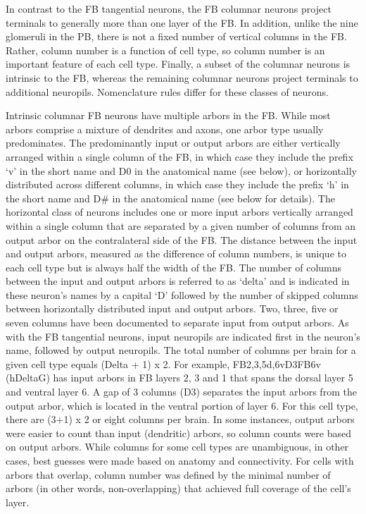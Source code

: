\documentclass{article}
\begin{document}
In contrast to the FB tangential neurons, the FB columnar neurons project terminals to generally more than one layer of the FB. In addition, unlike the nine glomeruli in the PB, there is not a fixed number of vertical columns in the FB. Rather, column number is a function of cell type, so column number is an important feature of each cell type. Finally, a subset of the columnar neurons is intrinsic to the FB, whereas the remaining columnar neurons project terminals to additional neuropils. Nomenclature rules differ for these classes of neurons.

Intrinsic columnar FB neurons have multiple arbors in the FB. While most arbors comprise a mixture of dendrites and axons, one arbor type usually predominates. The predominantly input or output arbors are either vertically arranged within a single column of the FB, in which case they include the prefix ‘v’ in the short name and D0 in the anatomical name (see below), or horizontally distributed across different columns, in which case they include the prefix ‘h’ in the short name and D\# in the anatomical name (see below for details). The horizontal class of neurons includes one or more input arbors vertically arranged within a single column that are separated by a given number of columns from an output arbor on the contralateral side of the FB. The distance between the input and output arbors, measured as the difference of column numbers, is unique to each cell type but is always half the width of the FB. The number of columns between the input and output arbors is referred to as ‘delta’ and is indicated in these neuron’s names by a capital ‘D’ followed by the number of skipped columns between horizontally distributed input and output arbors. Two, three, five or seven columns have been documented to separate input from output arbors. As with the FB tangential neurons, input neuropils are indicated first in the neuron’s name, followed by output neuropils. The total number of columns per brain for a given cell type equals (Delta + 1) x 2. For example, FB2,3,5d,6vD3FB6v (hDeltaG) has input arbors in FB layers 2, 3 and 1 that spans the dorsal layer 5 and ventral layer 6. A gap of 3 columns (D3) separates the input arbors from the output arbor, which is located in the ventral portion of layer 6. For this cell type, there are (3+1) x 2 or eight columns per brain. In some instances, output arbors were easier to count than input (dendritic) arbors, so column counts were based on output arbors. While columns for some cell types are unambiguous, in other cases, best guesses were made based on anatomy and connectivity. For cells with arbors that overlap, column number was defined by the minimal number of arbors (in other words, non-overlapping) that achieved full coverage of the cell’s layer.
\end{document}
